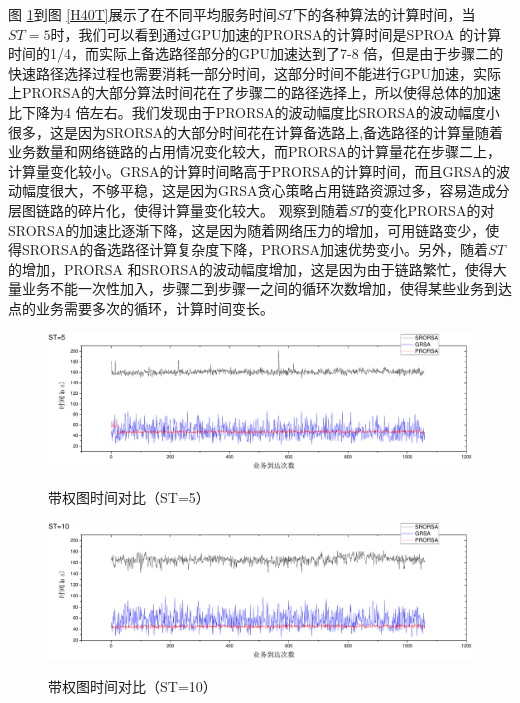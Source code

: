 图 \ref{H5T}到图 \ref{H40T}展示了在不同平均服务时间$ST$下的各种算法的计算时间，当$ST=5$时，我们可以看到通过GPU加速的PRORSA的计算时间是SPROA 的计算时间的1/4，而实际上备选路径部分的GPU加速达到了7-8 倍，但是由于步骤二的快速路径选择过程也需要消耗一部分时间，这部分时间不能进行GPU加速，实际上PRORSA的大部分算法时间花在了步骤二的路径选择上，所以使得总体的加速比下降为4 倍左右。我们发现由于PRORSA的波动幅度比SRORSA的波动幅度小很多，这是因为SRORSA的大部分时间花在计算备选路上,备选路径的计算量随着业务数量和网络链路的占用情况变化较大，而PRORSA的计算量花在步骤二上，计算量变化较小。GRSA的计算时间略高于PRORSA的计算时间，而且GRSA的波动幅度很大，不够平稳，这是因为GRSA贪心策略占用链路资源过多，容易造成分层图链路的碎片化，使得计算量变化较大。
观察到随着$ST$的变化PRORSA的对SRORSA的加速比逐渐下降，这是因为随着网络压力的增加，可用链路变少，使得SRORSA的备选路径计算复杂度下降，PRORSA加速优势变小。另外，随着$ST$的增加，PRORSA 和SRORSA的波动幅度增加，这是因为由于链路繁忙，使得大量业务不能一次性加入，步骤二到步骤一之间的循环次数增加，使得某些业务到达点的业务需要多次的循环，计算时间变长。
\begin{figure}
\setlength{\belowcaptionskip}{-0.5cm}
\begin{center}
{\includegraphics[width=1 \textwidth]{figures/H5T.pdf}}
\end{center}
\caption{{\footnotesize{带权图时间对比（ST=5）}}}
\label{H5T}
\end{figure}
\begin{figure}
\setlength{\belowcaptionskip}{-0.5cm}
\begin{center}
{\includegraphics[width=1 \textwidth]{figures/H10T.pdf}}
\end{center}
\caption{{\footnotesize{带权图时间对比（ST=10）}}}
\label{H10T}
\end{figure}
